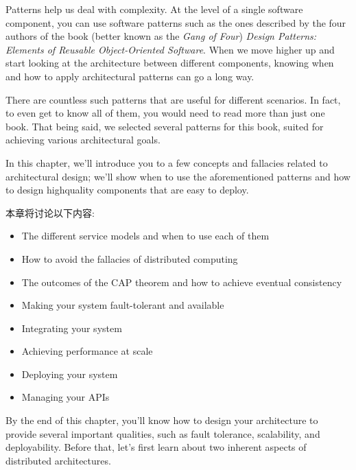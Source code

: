 
Patterns help us deal with complexity. At the level of a single software component, you can use software patterns such as the ones described by the four authors of the book (better known as the \textit{Gang of Four}) \textit{Design Patterns: Elements of Reusable Object-Oriented Software}. When we move higher up and start looking at the architecture between different components, knowing when and how to apply architectural patterns can go a long way.

There are countless such patterns that are useful for different scenarios. In fact, to even get to know all of them, you would need to read more than just one book. That being said, we selected several patterns for this book, suited for achieving various architectural goals.

In this chapter, we'll introduce you to a few concepts and fallacies related to architectural design; we'll show when to use the aforementioned patterns and how to design highquality components that are easy to deploy.


本章将讨论以下内容:

\begin{itemize}
\item The different service models and when to use each of them
\item How to avoid the fallacies of distributed computing
\item The outcomes of the CAP theorem and how to achieve eventual consistency
\item Making your system fault-tolerant and available
\item Integrating your system
\item Achieving performance at scale
\item Deploying your system
\item Managing your APIs

\end{itemize}

By the end of this chapter, you'll know how to design your architecture to provide several important qualities, such as fault tolerance, scalability, and deployability. Before that, let's first learn about two inherent aspects of distributed architectures.



























